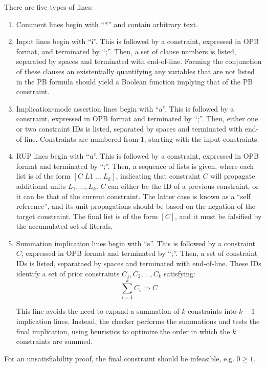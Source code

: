 \documentclass{fmcad}
\begin{document}
There are five types of lines:
\begin{enumerate}
\item Comment lines begin with ``*'' and contain arbitrary text.
\item Input lines begin with ``i''. This is followed by a constraint, expressed in OPB format,
  and terminated by ``;''. Then, a set of clause numbers is listed, separated by spaces and
  terminated with end-of-line. Forming the conjunction of these clauses an existentially quantifying
  any variables that are not listed in the PB formula should yield a Boolean function implying that
  of the PB constraint.
\item Implication-mode assertion lines begin with ``a''. This is followed by a constraint,
  expressed in OPB format and terminated by ``;''. Then, either one or two constraint IDs is
  listed, separated by spaces and terminated with end-of-line. Constraints are numbered from 1,
  starting with the input constraints.
\item RUP lines begin with ``u''. This is followed by a constraint, expressed in OPB format and
  terminated by ``;''. Then, a sequence of lists is given, where each list is of the form
  $[C \; L1 \; \dots \; L_k]$, indicating that constraint $C$ will propagate additional units
  $L_1, \dots, L_k$. $C$ can either be the ID of a previous constraint, or it can be that
  of the current constraint. The latter case is known as a ``self reference'', and its unit
  propagations should be based on the negation of the target constraint. The final list is of
  the form $[C]$, and it must be falsified by the accumulated set of literals.
\item Summation implication lines begin with ``s''. This is followed by a constraint $C$,
  expressed in OPB format and terminated by ``;''. Then, a set of constraint IDs is listed,
  separataed by spaces and terminated with end-of-line. These IDs identify a set of prior constraints
  $C_1, C_2, \dots, C_k$ satisfying:
  \[
    \sum_{i = 1}^{k} C_i \Longrightarrow C
  \]

  This line avoids the need to expand a summation of $k$ constraints into $k - 1$ implication lines.
  Instead, the checker performs the summations and tests the final implication, using heuristics
  to optimize the order in which the $k$ constraints are summed.
\end{enumerate}

For an unsatisfiability proof, the final constraint should be infeasible, e.g. $0 \geq 1$.
\end{document}
